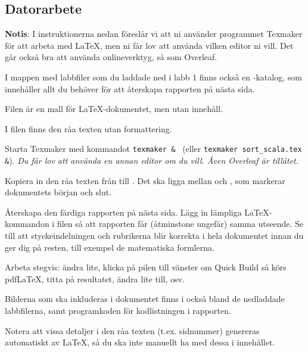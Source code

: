 \newpage

\subsection*{Datorarbete}

\textbf{Notis}: I instruktionerna nedan föreslår vi att ni använder programmet Texmaker för att arbeta med \LaTeX, men ni får lov att använda vilken editor ni vill. Det går också bra att använda onlineverktyg, så som Overleaf.

\begin{Datorarbete}
	\item I mappen med labbfiler som du laddade ned i labb 1 finns också en -katalog, som innehåller allt du behöver för att återskapa rapporten på nästa sida.
	\item Filen  är en mall för \LaTeX-dokumentet, men utan innehåll.
    \item I filen  finns den råa texten utan formattering.
	\item Starta Texmaker med kommandot \verb/texmaker & / (eller \verb/texmaker sort_scala.tex &/). \emph{Du får lov att använda en annan editor om du vill. Åven Overleaf är tillåtet.}
	\item Kopiera in den råa texten från  till . Det ska ligga mellan \verb// och \verb//, som markerar dokumentets början och slut.
	\item Återskapa den färdiga rapporten på nästa sida. Lägg in lämpliga \LaTeX-kommandon i filen så att rapporten får (åtminstone ungefär) samma utseende. Se till att styckeindelningen och rubrikerna blir korrekta i hela dokumentet innan du ger dig på resten, till exempel de matematiska formlerna.

	Arbeta stegvis: ändra lite, klicka på pilen till vänster om Quick Build så körs pdfLaTeX, titta på resultatet, ändra lite till, osv.

	Bilderna som ska inkluderas i dokumentet finns i också bland de nedladdade labbfilerna, samt programkoden för kodlistningen i rapporten.

    Notera att vissa detaljer i den råa texten (t.ex. sidnummer) genereras automatiskt av \LaTeX, så du ska inte manuellt ha med dessa i innehållet.

    \smallskip


\end{Datorarbete}
